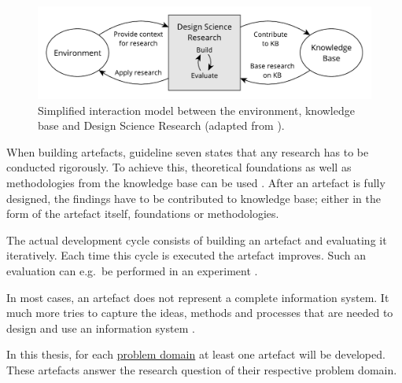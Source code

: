 \begin{figure}[H]
\begin{center}
  \includegraphics[scale=0.7]{images/figures/design_science_cycles.pdf}
\end{center}
\caption[Simplified interaction model between the environment, knowledge base and Design Science Research.]{Simplified interaction model between the environment, knowledge base and Design Science Research (adapted from \autocite[Fig. 1]{HevnerThreeCycleView2007}).}
\label{fig:design_science_cycles}
\end{figure}

When building artefacts, guideline seven states that any research has to be
conducted rigorously. To achieve this, theoretical foundations as well as
methodologies from the knowledge base can be used \autocite[p.
88]{VonAlanDesignscienceinformation2004}. After an artefact is fully designed,
the findings have to be contributed to knowledge base; either in the form of
the artefact itself, foundations or methodologies.

The actual development cycle consists of building an artefact and evaluating it
iteratively. Each time this cycle is executed the artefact improves. Such an
evaluation can e.g.\ be performed in an experiment \autocite[p.
91]{HevnerThreeCycleView2007}.

In most cases, an artefact does not represent a complete information system. It
much more tries to capture the ideas, methods and processes that are needed to
design and use an information system \autocite[p.
83]{VonAlanDesignscienceinformation2004}.

In this thesis, for each \href{link:problem_domains}{problem domain} at least
one artefact will be developed. These artefacts answer the research question of
their respective problem domain. 

